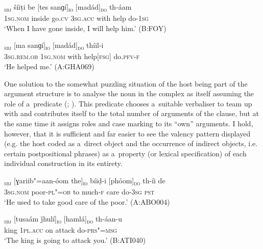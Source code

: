 \begin{exe}
\ex
\label{ex:12-77}
\gll [ma]\textsubscript{\textsc{sbj}} šíiṭi be [tes sanɡí]\textsubscript{\textsc{io}} [madád]\textsubscript{\textsc{do}} th-áam  \\
\textsc{1sg.nom} inside go.\textsc{cv} \textsc{3sg.acc} with help do-\textsc{1sg} \\
\glt `When I have gone inside, I will help him.' (B:FOY)
\end{exe}
\begin{exe}
\ex
\label{ex:12-78}
\gll [eetíi]\textsubscript{\textsc{sbj}} [ma sanɡí]\textsubscript{\textsc{io}} [madád]\textsubscript{\textsc{do}} thíil-i  \\
\textsc{3sg.rem.ob} \textsc{1sg.nom} with help[\textsc{fsg]} do.\textsc{pfv-f}  \\
\glt `He helped me.' (A:GHA069)
\end{exe}

One solution to the somewhat puzzling situation of the host being part of the argument structure is to analyse the noun in the complex as itself assuming the role of a~predicate (\citealt[204--212]{verma1993}; \citealt[164--170]{mohanan1993}). This predicate chooses a~suitable verbaliser to team up with and contributes itself to the total number of arguments of the clause, but at the same time it assigns roles and case marking to its ``own'' arguments. I hold, however, that it is sufficient and far easier to see the valency pattern displayed (e.g. the host coded as a~direct object and the occurrence of indirect objects, i.e. certain postpositional phrases) as a~property (or lexical specification) of each individual construction in its entirety. 

\begin{exe}
\ex
\label{ex:12-79}
\gll [so]\textsubscript{\textsc{sbj}} [ɣariib"=aan-óom the]\textsubscript{\textsc{io}} bíiḍ-i [phóom]\textsubscript{\textsc{do}} th-íi de  \\
\textsc{3sg.nom} poor-\textsc{pl"=ob} to much-\textsc{f} care do-\textsc{3sg}  \textsc{pst} \\
\glt `He used to take good care of the poor.' (A:ABO004)
\end{exe}
\begin{exe}
\ex
\label{ex:12-80}
\gll [ṣuú]\textsubscript{\textsc{sbj}} [tusaám ǰhulí]\textsubscript{\textsc{io}} [hamlá]\textsubscript{\textsc{do}} th-áan-u  \\
king \textsc{1pl.acc} on attack do-\textsc{prs"=msg}  \\
\glt `The king is going to attack you.' (B:ATI040)
\end{exe}

